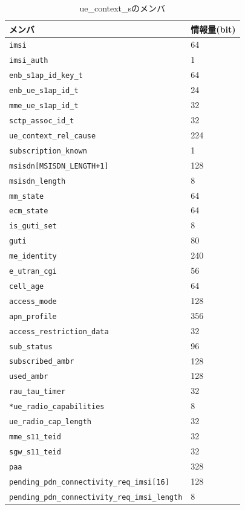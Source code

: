\documentclass[a4j]{ujarticle}
\begin{document}
\begin{table}[htbp]
  \centering
  \caption{ue\_context\_sのメンバ}
  \label{table:oai_source_ue_context_s}
  \begin{tabular}{l|l}
    \hline
    メンバ & 情報量(bit) \\ \hline \hline
    \verb|imsi| & 64\\
    \verb|imsi_auth| & 1\\
    \verb|enb_s1ap_id_key_t| & 64\\
    \verb|enb_ue_s1ap_id_t| & 24\\
    \verb|mme_ue_s1ap_id_t | & 32\\
    \verb|sctp_assoc_id_t | & 32\\
    \verb|ue_context_rel_cause| & 224\\ %
    \verb|subscription_known| & 1\\
    \verb|msisdn[MSISDN_LENGTH+1]| & 128\\
    \verb|msisdn_length| & 8\\
    \verb|mm_state| & 64\\
    \verb|ecm_state| & 64\\
    \verb|is_guti_set| & 8\\
    \verb|guti| & 80\\ %
    \verb|me_identity| & 240\\
    \verb|e_utran_cgi| & 56\\
    \verb|cell_age| & 64\\
    \verb|access_mode| &128 \\
    \verb|apn_profile| &356 \\
    \verb|access_restriction_data| & 32\\%
    \verb|sub_status| & 96\\
    \verb|subscribed_ambr| & 128\\
    \verb|used_ambr| & 128\\
    \verb|rau_tau_timer| & 32\\
    \verb|*ue_radio_capabilities| & 8\\
    \verb|ue_radio_cap_length| & 32\\
    \verb|mme_s11_teid| & 32\\
    \verb|sgw_s11_teid| & 32\\
    \verb|paa| & 328\\%
    \verb|pending_pdn_connectivity_req_imsi[16]| & 128\\
    \verb|pending_pdn_connectivity_req_imsi_length| & 8\\

\end{tabular}
\end{table}
\end{document}
